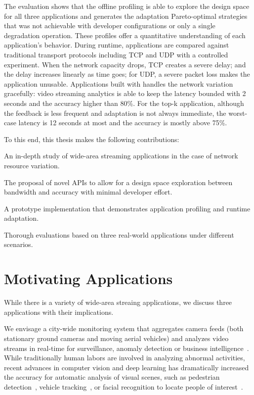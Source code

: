 The evaluation shows that the offline profiling is able to explore the design
space for all three applications and generates the adaptation Pareto-optimal
strategies that was not achievable with developer configurations or only a
single degradation operation. These profiles offer a quantitative understanding
of each application's behavior. During runtime, \sysname{} applications are
compared against traditional transport protocols including TCP and UDP with a
controlled experiment. When the network capacity drops, TCP creates a severe
delay; and the delay increases linearly as time goes; for UDP, a severe packet
loss makes the application unusable. Applications built with \sysname{} handles
the network variation gracefully: video streaming analytics is able to keep the
latency bounded with 2 seconds and the accuracy higher than 80\%. For the top-k
application, although the feedback is less frequent and adaptation is not always
immediate, the worst-case latency is 12 seconds at most and the accuracy is
mostly above 75\%.

To this end, this thesis makes the following contributions:

\squishlist    %
\item An in-depth study of wide-area streaming applications in the case of
  network resource variation.
\item The proposal of novel APIs to allow for a design space exploration between
  bandwidth and accuracy with minimal developer effort.
\item A prototype implementation that demonstrates application profiling and
  runtime adaptation.
\item Thorough evaluations based on three real-world applications under
  different scenarios.
\squishend %

\section{Motivating Applications}
\label{sec:motiv-appl}

While there is a variety of wide-area streaing applications, we discuss three
applications with their implications.

 We envisage a city-wide monitoring system that
aggregates camera feeds (both stationary ground cameras and moving aerial
vehicles) and analyzes video streams in real-time for surveillance, anomaly
detection or business intelligence~\cite{oh2011large}. While traditionally human
labors are involved in analyzing abnormal activities, recent advances in
computer vision and deep learning has dramatically increased the accuracy for
automatic analysis of visual scenes, such as pedestrian
detection~\cite{dollar2012pedestrian}, vehicle tracking~\cite{coifman1998real},
or facial recognition to locate people of
interest~\cite{Lu:2015:SHF:2888116.2888245, parkhi2015deep}.

